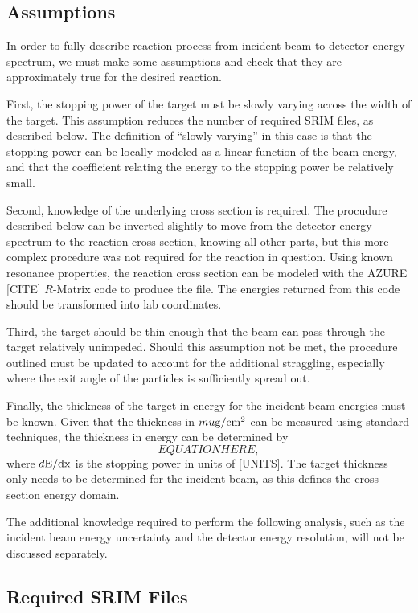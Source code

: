 \subsection{Assumptions}\label{assumptions}

In order to fully describe reaction process from incident beam to
detector energy spectrum, we must make some assumptions and check that
they are approximately true for the desired reaction.

First, the stopping power of the target must be slowly varying across
the width of the target. This assumption reduces the number of required
SRIM files, as described below. The definition of ``slowly varying'' in
this case is that the stopping power can be locally modeled as a linear
function of the beam energy, and that the coefficient relating the
energy to the stopping power be relatively small.

Second, knowledge of the underlying cross section is required. The
procudure described below can be inverted slightly to move from the
detector energy spectrum to the reaction cross section, knowing all
other parts, but this more-complex procedure was not required for the
reaction in question. Using known resonance properties, the
 reaction cross section
can be modeled with the AZURE [CITE] $R$-Matrix code to produce
the file. The energies returned from this code should be transformed
into lab coordinates.

Third, the target should be thin enough that the beam can pass through
the target relatively unimpeded. Should this assumption not be met, the
procedure outlined must be updated to account for the additional
straggling, especially where the exit angle of the particles is
sufficiently spread out.

Finally, the thickness of the target in energy for the incident beam
energies must be known. Given that the thickness in
$mu\rm{g}/\rm{cm}^2$ can be measured using standard techniques,
the thickness in energy can be determined by
\[
    EQUATION HERE,
\]
where $d\rm{E}/dx$ is the stopping power in units of [UNITS]. The
target thickness only needs to be determined for the incident beam, as
this defines the cross section energy domain.

The additional knowledge required to perform the following analysis,
such as the incident beam energy uncertainty and the detector energy
resolution, will not be discussed separately.


\subsection{Required SRIM Files}\label{required-srim-files}


